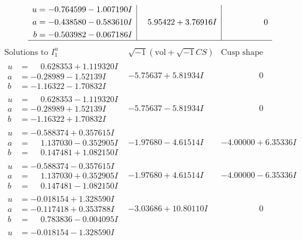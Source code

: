 \documentclass[1p]{elsarticle_modified}
\theoremstyle{definition}
\newcommand{\I}{\sqrt{-1}}
\begin{document}
$$\begin{array}{c|c|c}
\begin{aligned}
u &= -0.764599 - 1.007190 I \\
a &= -0.438580 - 0.583610 I \\
b &= -0.503982 - 0.067186 I\end{aligned}
 & \phantom{-}5.95422 + 3.76916 I & \phantom{-0.000000 } 0\\
 \hline 
 \end{array}$$\newpage$$\begin{array}{c|c|c}  
\text{Solutions to }I^u_{1}& \I (\text{vol} + \sqrt{-1}CS) & \text{Cusp shape}\\
 \hline 
\begin{aligned}
u &= \phantom{-}0.628353 + 1.119320 I \\
a &= -0.28989 - 1.52139 I \\
b &= -1.16322 - 1.70832 I\end{aligned}
 & -5.75637 + 5.81934 I & \phantom{-0.000000 } 0 \\ \hline\begin{aligned}
u &= \phantom{-}0.628353 - 1.119320 I \\
a &= -0.28989 + 1.52139 I \\
b &= -1.16322 + 1.70832 I\end{aligned}
 & -5.75637 - 5.81934 I & \phantom{-0.000000 } 0 \\ \hline\begin{aligned}
u &= -0.588374 + 0.357615 I \\
a &= \phantom{-}1.137030 - 0.352905 I \\
b &= \phantom{-}0.147481 + 1.082150 I\end{aligned}
 & -1.97680 - 4.61514 I & -4.00000 + 6.35336 I \\ \hline\begin{aligned}
u &= -0.588374 - 0.357615 I \\
a &= \phantom{-}1.137030 + 0.352905 I \\
b &= \phantom{-}0.147481 - 1.082150 I\end{aligned}
 & -1.97680 + 4.61514 I & -4.00000 - 6.35336 I \\ \hline\begin{aligned}
u &= -0.018154 + 1.328590 I \\
a &= -0.117418 + 0.353788 I \\
b &= \phantom{-}0.783836 - 0.004095 I\end{aligned}
 & -3.03686 + 10.80110 I & \phantom{-0.000000 } 0 \\ \hline\begin{aligned}
u &= -0.018154 - 1.328590 I \\

\end{aligned}
\end{array}$$
\end{document}
